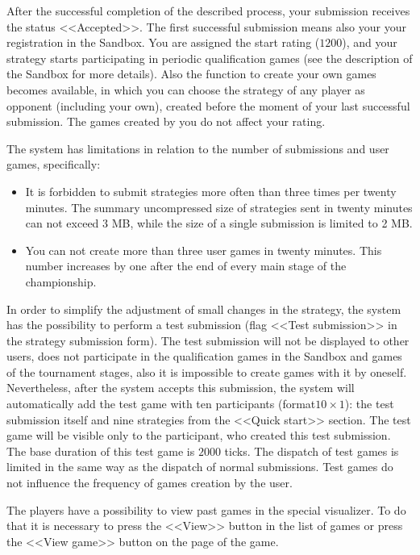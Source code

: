 After the successful completion of the described process, your submission receives the status <<Accepted>>. The first successful submission means also your
your registration in the Sandbox. You are assigned the start rating ($1200$), and your strategy starts participating in periodic
qualification games (see the description of the Sandbox for more details). Also the function to create
your own games becomes available, in which you can choose the strategy of any player as opponent (including your own), created before
the moment of your last successful submission. The games created by you do not affect your rating.

The system has limitations in relation to the number of submissions and user games, specifically:
\vspace{-0.15in}
\begin{itemize}
  \item It is forbidden to submit strategies more often than three times per twenty minutes. The summary uncompressed size of strategies
        sent in twenty minutes can not exceed 3 MB, while the size of a single submission is limited to 2 MB.
\vspace{-0.10in}
  \item You can not create more than three user games in twenty minutes. This number increases by one after the end of every main stage of
        the championship.
\vspace{-0.10in}
\end{itemize}

In order to simplify the adjustment of small changes in the strategy, the system has the possibility to perform a test submission (flag <<Test submission>>
in the strategy submission form). The test submission will not be displayed to other users, does not participate in the qualification games in the Sandbox and
games of the tournament stages, also it is impossible to create games with it by oneself. Nevertheless, after the system accepts this submission, the system
will automatically add the test game with ten participants (format$10\times1$): the test submission itself and nine strategies from
the <<Quick start>> section. The test game will be visible only to the participant, who created this test submission. The base duration of this test
game is $2000$ ticks. The dispatch of test games is limited in the same way as the dispatch of normal submissions. Test games do not influence
the frequency of games creation by the user.
 
The players have a possibility to view past games in the special visualizer. To do that it is necessary to press the <<View>> button in the list of games
or press the <<View game>> button on the page of the game.
 
